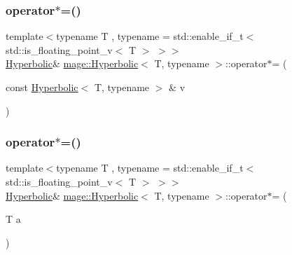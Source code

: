 \subsubsection{\texorpdfstring{operator$\ast$=()}{operator*=()}\hspace{0.1cm}{\footnotesize\ttfamily [1/2]}}
{\footnotesize\ttfamily template$<$typename T , typename  = std\+::enable\+\_\+if\+\_\+t$<$ std\+::is\+\_\+floating\+\_\+point\+\_\+v$<$ T $>$ $>$$>$ \\
\mbox{\hyperlink{structmage_1_1_hyperbolic}{Hyperbolic}}\& \mbox{\hyperlink{structmage_1_1_hyperbolic}{mage\+::\+Hyperbolic}}$<$ T, typename $>$\+::operator$\ast$= (\begin{DoxyParamCaption}\item[{const \mbox{\hyperlink{structmage_1_1_hyperbolic}{Hyperbolic}}$<$ T, typename $>$ \&}]{v }\end{DoxyParamCaption})\hspace{0.3cm}{\ttfamily [noexcept]}}

\mbox{\label{structmage_1_1_hyperbolic_a5e8f03e6344d4a4ab2b606d9e0cfeee8}} 
\subsubsection{\texorpdfstring{operator$\ast$=()}{operator*=()}\hspace{0.1cm}{\footnotesize\ttfamily [2/2]}}
{\footnotesize\ttfamily template$<$typename T , typename  = std\+::enable\+\_\+if\+\_\+t$<$ std\+::is\+\_\+floating\+\_\+point\+\_\+v$<$ T $>$ $>$$>$ \\
\mbox{\hyperlink{structmage_1_1_hyperbolic}{Hyperbolic}}\& \mbox{\hyperlink{structmage_1_1_hyperbolic}{mage\+::\+Hyperbolic}}$<$ T, typename $>$\+::operator$\ast$= (\begin{DoxyParamCaption}\item[{T}]{a }\end{DoxyParamCaption})\hspace{0.3cm}{\ttfamily [noexcept]}}

\mbox{\label{structmage_1_1_hyperbolic_a0a10618ebc7e81c2830118d17f241180}} 

